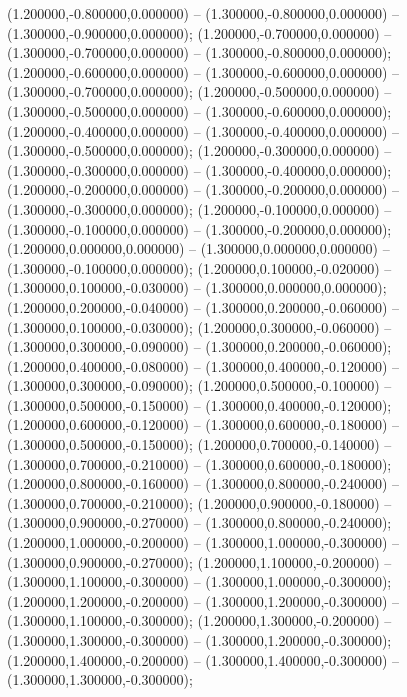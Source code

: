  (1.200000,-0.800000,0.000000) -- (1.300000,-0.800000,0.000000) -- (1.300000,-0.900000,0.000000);
 (1.200000,-0.700000,0.000000) -- (1.300000,-0.700000,0.000000) -- (1.300000,-0.800000,0.000000);
 (1.200000,-0.600000,0.000000) -- (1.300000,-0.600000,0.000000) -- (1.300000,-0.700000,0.000000);
 (1.200000,-0.500000,0.000000) -- (1.300000,-0.500000,0.000000) -- (1.300000,-0.600000,0.000000);
 (1.200000,-0.400000,0.000000) -- (1.300000,-0.400000,0.000000) -- (1.300000,-0.500000,0.000000);
 (1.200000,-0.300000,0.000000) -- (1.300000,-0.300000,0.000000) -- (1.300000,-0.400000,0.000000);
 (1.200000,-0.200000,0.000000) -- (1.300000,-0.200000,0.000000) -- (1.300000,-0.300000,0.000000);
 (1.200000,-0.100000,0.000000) -- (1.300000,-0.100000,0.000000) -- (1.300000,-0.200000,0.000000);
 (1.200000,0.000000,0.000000) -- (1.300000,0.000000,0.000000) -- (1.300000,-0.100000,0.000000);
 (1.200000,0.100000,-0.020000) -- (1.300000,0.100000,-0.030000) -- (1.300000,0.000000,0.000000);
 (1.200000,0.200000,-0.040000) -- (1.300000,0.200000,-0.060000) -- (1.300000,0.100000,-0.030000);
 (1.200000,0.300000,-0.060000) -- (1.300000,0.300000,-0.090000) -- (1.300000,0.200000,-0.060000);
 (1.200000,0.400000,-0.080000) -- (1.300000,0.400000,-0.120000) -- (1.300000,0.300000,-0.090000);
 (1.200000,0.500000,-0.100000) -- (1.300000,0.500000,-0.150000) -- (1.300000,0.400000,-0.120000);
 (1.200000,0.600000,-0.120000) -- (1.300000,0.600000,-0.180000) -- (1.300000,0.500000,-0.150000);
 (1.200000,0.700000,-0.140000) -- (1.300000,0.700000,-0.210000) -- (1.300000,0.600000,-0.180000);
 (1.200000,0.800000,-0.160000) -- (1.300000,0.800000,-0.240000) -- (1.300000,0.700000,-0.210000);
 (1.200000,0.900000,-0.180000) -- (1.300000,0.900000,-0.270000) -- (1.300000,0.800000,-0.240000);
 (1.200000,1.000000,-0.200000) -- (1.300000,1.000000,-0.300000) -- (1.300000,0.900000,-0.270000);
 (1.200000,1.100000,-0.200000) -- (1.300000,1.100000,-0.300000) -- (1.300000,1.000000,-0.300000);
 (1.200000,1.200000,-0.200000) -- (1.300000,1.200000,-0.300000) -- (1.300000,1.100000,-0.300000);
 (1.200000,1.300000,-0.200000) -- (1.300000,1.300000,-0.300000) -- (1.300000,1.200000,-0.300000);
 (1.200000,1.400000,-0.200000) -- (1.300000,1.400000,-0.300000) -- (1.300000,1.300000,-0.300000);
